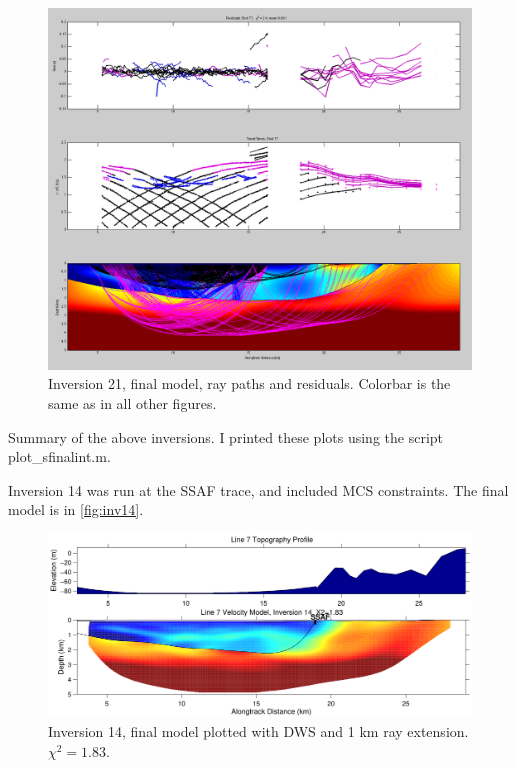 \documentclass[fontsize=11pt, %
                             paper=a4, %
                             twoside, %
                             captions=tableheading,
                             index=totoc,
                             hyperref]{labbook}
\begin{document}
\begin{addmargin}[4cm]{0cm}
\begin{figure}[h!]
\raggedleft
\includegraphics[scale=0.3,keepaspectratio=true]{figs/inv21finalRay.png}
\caption{Inversion 21, final model, ray paths and residuals. Colorbar is the same as in all other figures.}
\label{fig:inv21finalray}
\end{figure} 

\clearpage{}

Summary of the above inversions.  I printed these plots using the script plot\_sfinalint.m.

Inversion 14 was run at the SSAF trace, and included MCS constraints.  The final model is in \autoref{fig:inv14}.  

\begin{figure}[h!]
\raggedleft
\includegraphics[scale=0.6,keepaspectratio=true]{figs/interface_figures/inv14.pdf}
\caption{Inversion 14, final model plotted with DWS and 1 km ray extension.  $\chi^2 = 1.83$.}
\label{fig:inv14}
\end{figure} 


\end{addmargin}
\end{document}
